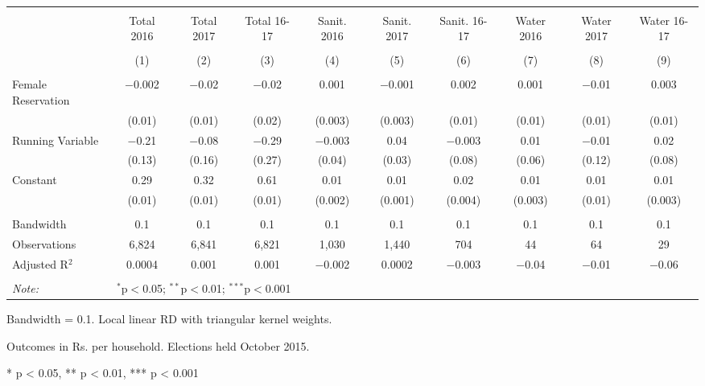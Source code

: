 \begin{table}
\centering
\begin{threeparttable}

  \caption{} 
  \label{} 
\scriptsize 
\begin{tabular}{@{\extracolsep{0pt}}lccccccccc} 
\\[-1.8ex]\hline 
\hline \\[-1.8ex] 
 & Total 2016 & Total 2017 & Total 16-17 & Sanit. 2016 & Sanit. 2017 & Sanit. 16-17 & Water 2016 & Water 2017 & Water 16-17 \\ 
\\[-1.8ex] & (1) & (2) & (3) & (4) & (5) & (6) & (7) & (8) & (9)\\ 
\hline \\[-1.8ex] 
 Female Reservation & $-$0.002 & $-$0.02 & $-$0.02 & 0.001 & $-$0.001 & 0.002 & 0.001 & $-$0.01 & 0.003 \\ 
  & (0.01) & (0.01) & (0.02) & (0.003) & (0.003) & (0.01) & (0.01) & (0.01) & (0.01) \\ 
  Running Variable & $-$0.21 & $-$0.08 & $-$0.29 & $-$0.003 & 0.04 & $-$0.003 & 0.01 & $-$0.01 & 0.02 \\ 
  & (0.13) & (0.16) & (0.27) & (0.04) & (0.03) & (0.08) & (0.06) & (0.12) & (0.08) \\ 
  Constant & 0.29 & 0.32 & 0.61 & 0.01 & 0.01 & 0.02 & 0.01 & 0.01 & 0.01 \\ 
  & (0.01) & (0.01) & (0.01) & (0.002) & (0.001) & (0.004) & (0.003) & (0.01) & (0.003) \\ 
 \hline \\[-1.8ex] 
Bandwidth & 0.1 & 0.1 & 0.1 & 0.1 & 0.1 & 0.1 & 0.1 & 0.1 & 0.1 \\ 
Observations & 6,824 & 6,841 & 6,821 & 1,030 & 1,440 & 704 & 44 & 64 & 29 \\ 
Adjusted R$^{2}$ & 0.0004 & 0.001 & 0.001 & $-$0.002 & 0.0002 & $-$0.003 & $-$0.04 & $-$0.01 & $-$0.06 \\ 
\hline 
\hline \\[-1.8ex] 
\textit{Note:}  & \multicolumn{9}{l}{$^{*}$p$<$0.05; $^{**}$p$<$0.01; $^{***}$p$<$0.001} \\ 
\end{tabular} 
\begin{tablenotes}[flushleft]
\setlength{\itemindent}{0em}
\scriptsize
\item[] Bandwidth = 0.1. Local linear RD with triangular kernel weights.
\item[] Outcomes in Rs. per household. Elections held October 2015.
\item[] * p < 0.05, ** p < 0.01, *** p < 0.001
\end{tablenotes}
\end{threeparttable}
\end{table}
